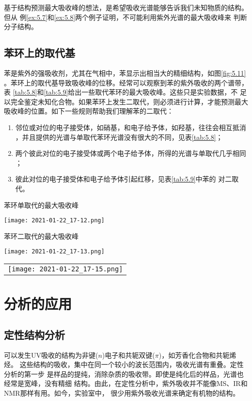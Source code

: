 基于结构预测最大吸收峰的想法，是希望吸收光谱能够告诉我们未知物质的结构。但从
例\ref{ex:5.7}和\ref{ex:5.8}两个例子证明，不可能利用紫外光谱的最大吸收峰来
判断分子结构。
\subsection{苯环上的取代基}
苯是紫外的强吸收剂，尤其在气相中，苯显示出相当大的精细结构，如图\ref{fig:5.11}
。苯环上的取代基导致吸收峰的位移。经常可以观察到苯的紫外吸收的两个谱带，表
\ref{tab:5.8}和\ref{tab:5.9}给出一些取代苯环的最大吸收峰。这些只是实验数据，不
足以完全鉴定未知化合物。如果苯环上发生二取代，则必须进行计算，才能预测最大
吸收峰的位置。如下一些规则帮助我们理解苯的二取代：
\begin{enumerate}
    \item 邻位或对位的电子接受体，如硝基，和电子给予体，如羟基，往往会相互抵消
        ，并且提供的光谱与单取代苯环光谱没有很大的不同，见表\ref{tab:5.8}；
    \item 两个彼此对位的电子接受体或两个电子给予体，所得的光谱与单取代几乎相同
        ；
    \item 彼此对位的电子接受体和电子给予体引起红移，见表\ref{tab:5.9}中苯的
        对二取代。
\end{enumerate}
\begin{table}[htbp]
    \centering
    \caption{苯环单取代的最大吸收峰}
    \label{tab:5.8}
    \texttt{[image: 2021-01-22\_17-12.png]}
\end{table}
\begin{table}[htbp]
    \centering
    \caption{苯环二取代的最大吸收峰}
    \label{tab:5.9}
    \texttt{[image: 2021-01-22\_17-13.png]}
\end{table}
\begin{example}
\begin{tabular}{c}
\texttt{[image: 2021-01-22\_17-15.png]}
\end{tabular}
\end{example}
\section{分析的应用}
\subsection{定性结构分析}
可以发生UV吸收的结构为非键($n$)电子和共轭双键($\pi$)，如芳香化合物和共轭烯烃。
这些结构的吸收，集中在同一个较小的波长范围内，吸收光谱有重叠。定性分析的第一步
是样品的提纯，消除杂质的吸收带。即使是纯化后的样品，光谱也经常是宽峰，没有精细
结构。由此，在定性分析中，紫外吸收并不能像MS、IR和NMR那样有用。如今，实验室中，
很少用紫外吸收光谱来确定有机物的结构。


